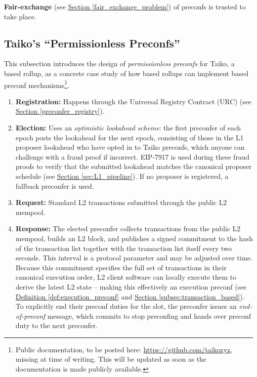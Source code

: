 \documentclass[a4paper]{article}
\theoremstyle{boldstyle}
\begin{document}
        \textbf{Fair-exchange} (see \hyperref[fair_exchange_problem]{Section \ref{fair_exchange_problem}}) of preconfs is trusted to take place. 

     \subsection{\textbf{Taiko's ``Permissionless Preconfs''}}
        This subsection introduces the design of \emph{permissionless preconfs} for Taiko, a based rollup, as a concrete case study of how based rollups can implement based preconf mechanisms\footnote{Public documentation, to be posted here: \url{https://github.com/taikoxyz}, missing at time of writing. This will be updated as soon as the documentation is made publicly available.}.
        
        \begin{enumerate}
        \item \textbf{Registration:} Happens through the Universal Registry Contract (URC) (see \hyperref[preconfer_registry]{Section \ref{preconfer_registry}}).
        \item \textbf{Election:} Uses an \emph{optimistic lookahead scheme}: the first preconfer of each epoch posts the lookahead for the next epoch, consisting of those in the L1 proposer lookahead who have opted in to Taiko preconfs, which anyone can challenge with a fraud proof if incorrect. EIP-7917 \cite{EIP7917} is used during these fraud proofs to verify that the submitted lookahead matches the canonical proposer schedule (see \hyperref[sec:L1_pipeline]{Section \ref{sec:L1_pipeline}}). If no proposer is registered, a fallback preconfer is used.
        \item \textbf{Request:} Standard L2 transactions submitted through the public L2 mempool.
        \item \textbf{Response:} The elected preconfer collects transactions from the public L2 mempool, builds an L2 block, and publishes a signed commitment to the hash of the transaction list together with the transaction list itself every two seconds. This interval is a protocol parameter and may be adjusted over time. Because this commitment specifies the full set of transactions in their canonical execution order, L2 client software can locally execute them to derive the latest L2 state -- making this effectively an execution preconf (see \hyperref[def:execution_preconf]{Definition \ref{def:execution_preconf}} and \hyperref [subsec:transaction_based]{Section \ref{subsec:transaction_based}}). To explicitly end their preconf duties for the slot, the preconfer issues an \emph{end-of-preconf} message, which commits to stop preconfing and hands over preconf duty to the next preconfer.

\end{enumerate}
\end{document}
